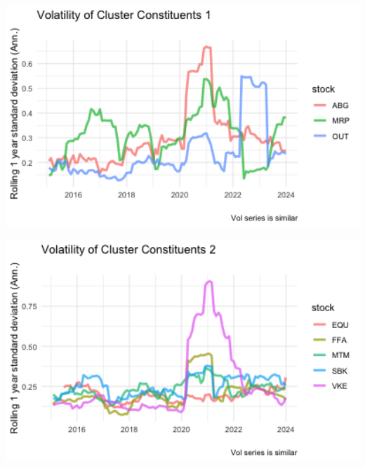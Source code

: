 \documentclass[11pt,preprint, authoryear]{elsarticle}
\let\origfigure\figure
\let\endorigfigure\endfigure
\renewenvironment{figure}[1][2] {
    \expandafter\origfigure\expandafter[H]
} {
    \endorigfigure
}
\numberwithin{equation}{section}
\numberwithin{figure}{section}
\numberwithin{table}{section}
\begin{document}
\begin{figure}[H]

\includegraphics[width=5.56in]{images/volplots_1} \hfill{}

\caption{ Clusters Results from Highest Silhoutte \label{fig2}}\label{fig:unnamed-chunk-6-1}
\end{figure}
\begin{figure}[H]

\includegraphics[width=5.56in]{images/volplots_2} \hfill{}

\caption{ Clusters Results from Highest Silhoutte \label{fig2}}\label{fig:unnamed-chunk-6-2}
\end{figure}
\end{document}
